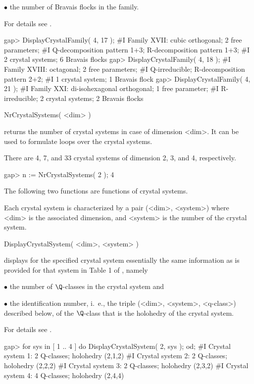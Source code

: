 \item{$\bullet$} the number of Bravais flocks in the family.
\endlist

For details see \cite{BBNWZ78}.

\beginexample
gap> DisplayCrystalFamily( 4, 17 );
#I Family XVII: cubic orthogonal; 2 free parameters;
#I  Q-decomposition pattern 1+3; R-decomposition pattern 1+3;
#I  2 crystal systems; 6 Bravais flocks
gap> DisplayCrystalFamily( 4, 18 );
#I Family XVIII: octagonal; 2 free parameters;
#I  Q-irreducible; R-decomposition pattern 2+2;
#I  1 crystal system; 1 Bravais flock
gap> DisplayCrystalFamily( 4, 21 );
#I Family XXI: di-isohexagonal orthogonal; 1 free parameter;
#I  R-irreducible; 2 crystal systems; 2 Bravais flocks
\endexample


\>NrCrystalSystems( <dim> )

returns the number of crystal systems in case of dimension <dim>. It
can be used to formulate loops over the crystal systems.

There are 4, 7, and 33 crystal systems of dimension 2, 3, and 4,
respectively.

\beginexample
gap> n := NrCrystalSystems( 2 );
4
\endexample

The following two functions are functions of crystal systems.

Each crystal system is characterized by a pair (<dim>, <system>) where
<dim>  is the associated dimension,  and  <system> is  the number of  the
crystal system.

\>DisplayCrystalSystem( <dim>, <system> )

displays for the specified crystal system essentially the same
information as is provided for that system in Table 1 of
\cite{BBNWZ78}, namely

\beginlist%
\item{$\bullet$} 
    the number of $\Q$-classes in the crystal system and
\item{$\bullet$} 
    the identification number, i.~e., the triple (<dim>, <system>,
    <q-class>) described below, of the $\Q$-class that is the 
    holohedry of the crystal system.  
\endlist

For details see \cite{BBNWZ78}.

\beginexample
gap> for sys in [ 1 .. 4 ] do  DisplayCrystalSystem( 2, sys );  od;
#I  Crystal system 1: 2 Q-classes; holohedry (2,1,2)
#I  Crystal system 2: 2 Q-classes; holohedry (2,2,2)
#I  Crystal system 3: 2 Q-classes; holohedry (2,3,2)
#I  Crystal system 4: 4 Q-classes; holohedry (2,4,4)
\endexample

